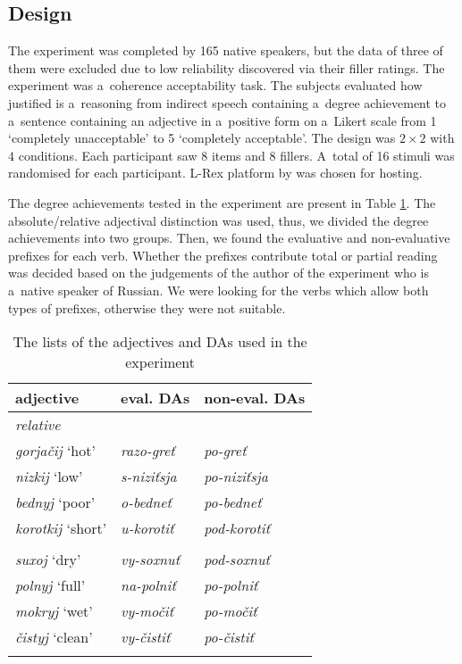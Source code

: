 \documentclass[output=paper]{langscibook}
\begin{document}
\subsection{Design}\label{DA:subsec:design}

The experiment was completed by 165 native speakers, but the data of three of them were excluded due to low reliability discovered via their filler ratings. The experiment was a~coherence acceptability task. The subjects evaluated how justified is a~reasoning from indirect speech containing a~degree achievement to a~sentence containing an adjective in a~positive form on a~Likert scale from 1 `completely unacceptable' to 5 `completely acceptable'. The design was $2\times 2$ with 4 conditions. Each participant saw 8 items and 8 fillers. A~total of 16 stimuli was randomised for each participant. L-Rex platform by \citet{lrex} was chosen for hosting.  

The degree achievements tested in the experiment are present in Table \ref{DA:tab:items}. The absolute/relative adjectival distinction was used, thus, we divided the degree achievements into two groups. Then, we found the evaluative and non-evaluative prefixes for each verb. Whether the prefixes contribute total or partial reading was decided based on the judgements of the author of the experiment who is a~native speaker of Russian. We were looking for the verbs which allow both types of prefixes, otherwise they were not suitable. 


\begin{table}
    \centering
    \begin{tabular}{lll}
         \lsptoprule
         adjective &  eval. DAs & non-eval. DAs \\\midrule
         \multicolumn{3}{l}{\textit{relative}} \\
         \textit{gorjačij} `hot' & \textit{razo-greť} & \textit{po-greť} \\
         \textit{nizkij} `low' & \textit{s-niziťsja} & \textit{po-niziťsja} \\
         \textit{bednyj} `poor' & \textit{o-bedneť} & \textit{po-bedneť} \\
         \textit{korotkij} `short' & \textit{u-korotiť} & \textit{pod-korotiť} \\
         \addlinespace
         \multicolumn{3}{l}{\textit{absolute}} \\
         \textit{suxoj} `dry' & \textit{vy-soxnuť} & \textit{pod-soxnuť} \\
         \textit{polnyj} `full' & \textit{na-polniť} & \textit{po-polniť} \\
         \textit{mokryj} `wet' & \textit{vy-močiť} & \textit{po-močiť} \\
         \textit{čistyj} `clean' & \textit{vy-čistiť} & \textit{po-čistiť} \\
         \lspbottomrule
    \end{tabular}
    \caption{The lists of the adjectives and DAs used in the experiment}
    \label{DA:tab:items}
\end{table}
\end{document}
